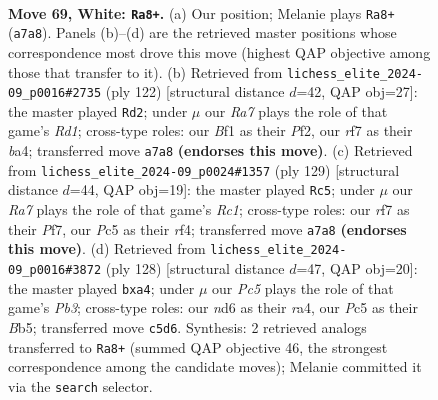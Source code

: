 \documentclass[11pt]{article}
\begin{document}
\clearpage

\begin{figure}[p]\centering
\begin{subfigure}{0.46\textwidth}\centering
\resizebox{\linewidth}{!}{%
\newchessgame
\chessboard[
  setfen={3k4/R4r1p/P2n4/2P5/8/2p4P/2P1K1P1/5B2 w - - 1 69},
  showmover=false,
  pgfstyle=straightmove, color=movearrow, markmove={a7-a8}
]}
\caption{}
\end{subfigure}\hfill
\begin{subfigure}{0.46\textwidth}\centering
\resizebox{\linewidth}{!}{%
\newchessgame
\chessboard[
  setfen={4k3/1rB5/1P5p/5p2/b4K2/7P/5PP1/3R4 w - - 6 62},
  showmover=false,
  pgfstyle=straightmove, color=movearrow, markmove={d1-d2}
]}
\caption{}
\end{subfigure}
\\[4pt]
\begin{subfigure}{0.46\textwidth}\centering
\resizebox{\linewidth}{!}{%
\newchessgame
\chessboard[
  setfen={2r5/1p3pk1/8/7p/P4Rb1/6P1/1KN2P2/8 b - - 0 65},
  showmover=false,
  pgfstyle=straightmove, color=movearrow, markmove={c8-c5}
]}
\caption{}
\end{subfigure}\hfill
\begin{subfigure}{0.46\textwidth}\centering
\resizebox{\linewidth}{!}{%
\newchessgame
\chessboard[
  setfen={5R2/1k5r/2RK4/1B2P3/r2p4/1P1P4/8/8 w - - 0 65},
  showmover=false,
  pgfstyle=straightmove, color=movearrow, markmove={b3-a4}
]}
\caption{}
\end{subfigure}
\caption{\textbf{Move 69, White: \texttt{Ra8+}.} (a) Our position; Melanie plays \texttt{Ra8+} (\texttt{a7a8}). Panels (b)--(d) are the retrieved master positions whose correspondence most drove this move (highest QAP objective among those that transfer to it). (b) Retrieved from \texttt{lichess\_elite\_2024-09\_p0016\#2735} (ply 122) [structural distance $d$=42, QAP obj=27]: the master played \texttt{Rd2}; under $\mu$ our \emph{Ra7} plays the role of that game's \emph{Rd1}; cross-type roles: our \emph{B}f1 as their \emph{P}f2, our \emph{r}f7 as their \emph{b}a4; transferred move \texttt{a7a8} \textbf{(endorses this move)}. (c) Retrieved from \texttt{lichess\_elite\_2024-09\_p0024\#1357} (ply 129) [structural distance $d$=44, QAP obj=19]: the master played \texttt{Rc5}; under $\mu$ our \emph{Ra7} plays the role of that game's \emph{Rc1}; cross-type roles: our \emph{r}f7 as their \emph{P}f7, our \emph{P}c5 as their \emph{r}f4; transferred move \texttt{a7a8} \textbf{(endorses this move)}. (d) Retrieved from \texttt{lichess\_elite\_2024-09\_p0016\#3872} (ply 128) [structural distance $d$=47, QAP obj=20]: the master played \texttt{bxa4}; under $\mu$ our \emph{Pc5} plays the role of that game's \emph{Pb3}; cross-type roles: our \emph{n}d6 as their \emph{r}a4, our \emph{P}c5 as their \emph{B}b5; transferred move \texttt{c5d6}. Synthesis: 2 retrieved analogs transferred to \texttt{Ra8+} (summed QAP objective 46, the strongest correspondence among the candidate moves); Melanie committed it via the \texttt{search} selector.}
\label{fig:thought-m136}
\end{figure}
\end{document}
